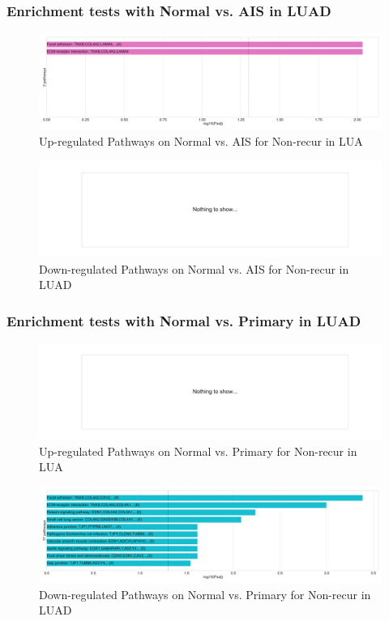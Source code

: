 \documentclass{beamer}
\begin{document}
    \begin{frame}
        \frametitle{Enrichment tests with Normal vs. AIS in LUAD}

        \begin{figure}
            \includegraphics[width=0.8 \linewidth]{figures/DEG/Enrichment/STAR.FPKM.ADC.Nonrecur.Normal-AIS.Up.KEGG.pdf}
            \caption{Up-regulated Pathways on Normal vs. AIS for Non-recur in LUA}
        \end{figure}

        \begin{figure}
            \includegraphics[width=0.8 \linewidth]{figures/DEG/Enrichment/STAR.FPKM.ADC.Nonrecur.Normal-AIS.Down.KEGG.pdf}
            \caption{Down-regulated Pathways on Normal vs. AIS for Non-recur in LUAD}
        \end{figure}
    \end{frame}

    \begin{frame}
        \frametitle{Enrichment tests with Normal vs. Primary in LUAD}

        \begin{figure}
            \includegraphics[width=0.8 \linewidth]{figures/DEG/Enrichment/STAR.FPKM.ADC.Nonrecur.Normal-Primary.Up.KEGG.pdf}
            \caption{Up-regulated Pathways on Normal vs. Primary for Non-recur in LUA}
        \end{figure}

        \begin{figure}
            \includegraphics[width=0.8 \linewidth]{figures/DEG/Enrichment/STAR.FPKM.ADC.Nonrecur.Normal-Primary.Down.KEGG.pdf}
            \caption{Down-regulated Pathways on Normal vs. Primary for Non-recur in LUAD}
        \end{figure}
    \end{frame}
\end{document}
